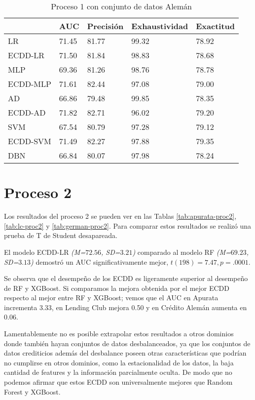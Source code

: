 \begin{table}[]
\centering
\caption{Proceso 1 con conjunto de datos Alemán}
\label{tab:german-proc1}
\begin{tabularx}{0.75\textwidth}{|l|Y Y Y Y|}
				\hline
				& AUC		& Precisión	& Exhaustividad	& Exactitud	\\
				\hline
LR				& 71.45		& 81.77		& 99.32			& 78.92		\\
ECDD-LR			& 71.50		& 81.84		& 98.83			& 78.68		\\
				\hline
MLP				& 69.36		& 81.26		& 98.76			& 78.78		\\
ECDD-MLP		& 71.61		& 82.44		& 97.08			& 79.00		\\
				\hline
AD				& 66.86		& 79.48		& 99.85			& 78.35		\\
ECDD-AD			& 71.82		& 82.71		& 96.02			& 79.20		\\
				\hline
SVM				& 67.54		& 80.79		& 97.28			& 79.12		\\
ECDD-SVM		& 71.49		& 82.27		& 97.88			& 79.35		\\
				\hline
DBN				& 66.84		& 80.07		& 97.98			& 78.24		\\
				\hline
\end{tabularx}
\end{table}


\section{Proceso 2} %

Los resultados del proceso 2 se pueden ver en las Tablas \ref{tab:apurata-proc2}, \ref{tab:lc-proc2} y \ref{tab:german-proc2}. Para comparar estos resultados se realizó una prueba de T de Student desapareada.

El modelo ECDD-LR \textit{(M=$72.56$, SD=$3.21$)} comparado al modelo \ac{RF} \textit{(M=$69.23$, SD=$3.13$)} demostró un \ac{AUC} significativamente mejor, $t(198)=7.47, p=.0001$.

Se observa que el desempeño de los \ac{ECDD} es ligeramente superior al desempeño de \ac{RF} y \ac{XGBoost}. Si comparamos la mejora obtenida por el mejor \ac{ECDD} respecto al mejor entre RF y XGBoost; vemos que el AUC en Apurata incrementa 3.33, en Lending Club mejora 0.50 y en Crédito Alemán aumenta en 0.06.

Lamentablemente no es posible extrapolar estos resultados a otros dominios donde también hayan conjuntos de datos desbalanceados, ya que los conjuntos de datos crediticios además del desbalance poseen otras características que podrían no cumplirse en otros dominios, como la estacionalidad de los datos, la baja cantidad de features y la información parcialmente oculta. De modo que no podemos afirmar que estos \ac{ECDD} son universalmente mejores que Random Forest y XGBoost.

